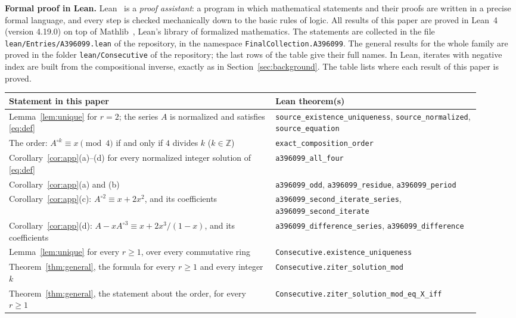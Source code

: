 \documentclass[11pt,a4paper]{article}
\theoremstyle{definition}
\theoremstyle{remark}
\newcommand{\Z}{\mathbb{Z}}
\newcommand{\para}[1]{\par\medskip\noindent\textbf{#1}\enspace}
\begin{document}
\para{Formal proof in Lean.}
Lean~\cite{lean} is a \emph{proof assistant}: a program in which mathematical statements and their proofs are written
in a precise formal language, and every step is checked mechanically down to the basic rules of logic. All results of
this paper are proved in Lean~4 (version 4.19.0) on top of Mathlib~\cite{mathlib}, Lean's library of formalized
mathematics. The statements are collected in the file \texttt{lean/Entries/A396099.lean} of the repository,
in the namespace \texttt{FinalCollection.A396099}. The general results for the whole family are proved in the folder \texttt{lean/Consecutive} of the
repository; the last rows of the table give their full names. In Lean, iterates with negative index are built from the
compositional inverse, exactly as in Section~\ref{sec:background}.
The table lists where each result of this paper is proved.
\begin{center}\small\renewcommand{\arraystretch}{1.25}
\begin{tabular}{>{\raggedright\arraybackslash}p{0.52\linewidth}>{\raggedright\arraybackslash}p{0.4\linewidth}}
\toprule
Statement in this paper & Lean theorem(s)\\
\midrule
Lemma~\ref{lem:unique} for $r=2$; the series $A$ is normalized and satisfies \eqref{eq:def} & \texttt{source\_\allowbreak{}existence\_\allowbreak{}uniqueness}, \texttt{source\_\allowbreak{}normalized}, \texttt{source\_\allowbreak{}equation} \\
The order: $A^{\circ k}\equiv x\pmod4$ if and only if $4$ divides $k$ ($k\in\Z$) & \texttt{exact\_\allowbreak{}composition\_\allowbreak{}order} \\
Corollary~\ref{cor:app}(a)--(d) for every normalized integer solution of \eqref{eq:def} & \texttt{a396099\_\allowbreak{}all\_\allowbreak{}four} \\
Corollary~\ref{cor:app}(a) and (b) & \texttt{a396099\_\allowbreak{}odd}, \texttt{a396099\_\allowbreak{}residue}, \texttt{a396099\_\allowbreak{}period} \\
Corollary~\ref{cor:app}(c): $A^{\circ2}\equiv x+2x^2$, and its coefficients & \texttt{a396099\_\allowbreak{}second\_\allowbreak{}iterate\_\allowbreak{}series}, \texttt{a396099\_\allowbreak{}second\_\allowbreak{}iterate} \\
Corollary~\ref{cor:app}(d): $A-xA^{\circ3}\equiv x+2x^3/(1-x)$, and its coefficients & \texttt{a396099\_\allowbreak{}difference\_\allowbreak{}series}, \texttt{a396099\_\allowbreak{}difference} \\
Lemma~\ref{lem:unique} for every $r\ge1$, over every commutative ring & \texttt{Consecutive.existence\_\allowbreak{}uniqueness} \\
Theorem~\ref{thm:general}, the formula for every $r\ge1$ and every integer $k$ & \texttt{Consecutive.ziter\_\allowbreak{}solution\_\allowbreak{}mod} \\
Theorem~\ref{thm:general}, the statement about the order, for every $r\ge1$ & \texttt{Consecutive.ziter\_\allowbreak{}solution\_\allowbreak{}mod\_\allowbreak{}eq\_\allowbreak{}X\_\allowbreak{}iff} \\
\bottomrule
\end{tabular}
\end{center}
\end{document}
